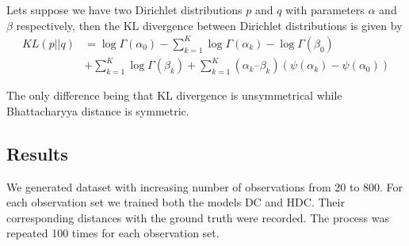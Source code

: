 Lets suppose we have two Dirichlet distributions $p$ and $q$ with parameters $\alpha$ and $\beta$ respectively, then the KL divergence between Dirichlet distributions\cite{kurt2013} is given by
\begin{equation*}
	\begin{split} 
 KL (p||q) &= \log \Gamma (\alpha_0) - \sum_{k=1}^K \log \Gamma (\alpha_k)   
 - \log \Gamma (\beta_0) \\ &+ \sum_{k=1}^K \log \Gamma (\beta_k)  + \sum_{k=1}^K  (\alpha_k – \beta_k)  (\psi (\alpha_k)-\psi (\alpha_0)) 
\end{split}
\end{equation*}


The only difference being that KL divergence is unsymmetrical while Bhattacharyya distance is symmetric. 

\subsection{Results}
We generated dataset with increasing number of observations from 20 to 800. For each observation set we trained both the models DC and HDC. Their corresponding distances with the ground truth were recorded. The process was repeated 100 times for each observation set.

